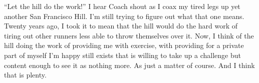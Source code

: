 \documentclass[12pt, oneside]{memoir}
\begin{document}
``Let the hill do the work!'' I hear Coach shout as I coax my
tired legs up yet another San Francisco Hill.
I'm still trying to figure out what that one means.
Twenty years ago, I took it to mean that the hill would do the hard
work of tiring out other runners less able to throw themselves over
it.
Now, I think of the hill doing the work of providing me with exercise,
with providing for a private part of myself I'm happy still exists
that is willing to take up a challenge but content enough to see it
as nothing more.
As just a matter of course.
And I think that is plenty.


\end{document}
